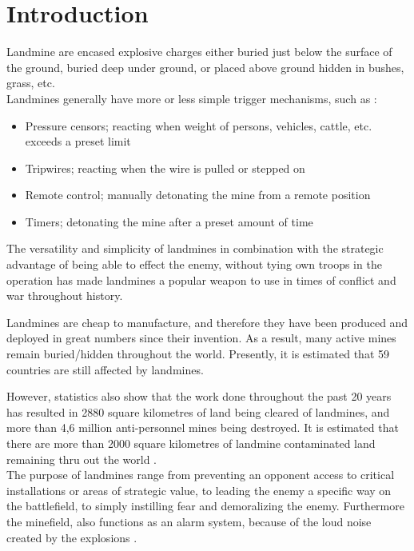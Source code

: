 \chapter{Introduction} \label{chap:Introduction}

Landmine are encased explosive charges either buried just below the surface of the ground, buried deep under ground, or placed above ground hidden in bushes, grass, etc.\\
Landmines generally have more or less simple trigger mechanisms, such as \cite{EB:Mine}:

\begin{itemize}
\setlength{\itemsep}{0.05\baselineskip}
    \item Pressure censors; reacting when weight of persons, vehicles, cattle, etc. exceeds a preset limit
    \item Tripwires; reacting when the wire is pulled or stepped on
    \item Remote control; manually detonating the mine from a remote position
    \item Timers; detonating the mine after a preset amount of time
\end{itemize}

The versatility and simplicity of landmines in combination with the strategic advantage of being able to effect the enemy, without tying own troops in the operation has made landmines a popular weapon to use in times of conflict and war throughout history.

Landmines are cheap to manufacture, and therefore they have been produced and deployed in great numbers since their invention. As a result, many active mines remain buried/hidden throughout the world. Presently, it is estimated that 59 countries are still affected by landmines. \cite{LandmineMonitor2019}

However, statistics also show that the work done throughout the past 20 years has resulted in 2880 square kilometres of land being cleared of landmines, and more than 4,6 million anti-personnel mines being destroyed. It is estimated that there are more than 2000 square kilometres of landmine contaminated land remaining thru out the world \cite{clearingTheMines}.\\

The purpose of landmines range from preventing an opponent access to critical installations or areas of strategic value, to leading the enemy a specific way on the battlefield, to simply instilling fear and demoralizing the enemy. Furthermore the minefield, also functions as an alarm system, because of the loud noise created by the explosions \cite{clearingTheMines}.\\

